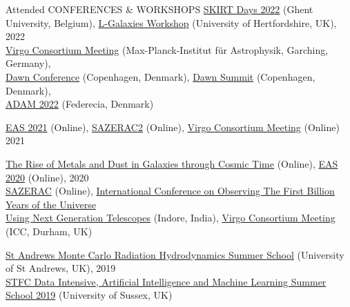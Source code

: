 \documentclass[a4paper,10pt]{resume} %
\begin{document}
\begin{rSection}{Attended CONFERENCES \& WORKSHOPS}
{\href{skirtdays2022.ugent.be}{\color{blue}\textrm{SKIRT Days 2022}} (Ghent University, Belgium), \href{https://lgalaxiespublicrelease.github.io/workshop2022.html}{\color{blue}\textrm{L-Galaxies Workshop}} (University of Hertfordshire, UK),} \hfill {2022}
\\
\href{http://www.virgo.dur.ac.uk/}{\color{blue}\textrm{Virgo Consortium Meeting}} (Max-Planck-Institut f\"{u}r Astrophysik, Garching, Germany),\\
\href{https://cosmicdawn.dk/event/copenhagen-dawn-conference-2022/}{\color{blue}\textrm{Dawn Conference}} (Copenhagen, Denmark), {\href{https://cosmicdawn.dk/meetings-and-workshops/dawn-summit-2022/}{\color{blue}\textrm{Dawn Summit}}} (Copenhagen, Denmark), \\{\href{https://events.au.dk/adam2022/conference}{\color{blue}\textrm{ADAM 2022}} (Federecia, Denmark)}

{\href{https://eas.unige.ch//EAS2021/about.jsp}{\color{blue}\textrm{EAS 2021}} (Online), \href{http://sazerac-conference.org/2021/}{\color{blue}\textrm{SAZERAC2}} (Online), \href{http://www.virgo.dur.ac.uk/}{\color{blue}\textrm{Virgo Consortium Meeting}} (Online)} \hfill {2021}

{\href{https://metals-dust.sciencesconf.org/}{\color{blue}\textrm{The Rise of Metals and Dust in Galaxies through Cosmic Time}} (Online), \href{https://eas.unige.ch/EAS2020/}{\color{blue}\textrm{EAS 2020}} (Online),} \hfill {2020}
\\
\href{http://sazerac-conference.org/2020/}{\color{blue}\textrm{SAZERAC}} (Online), \href{http://www.iiti.ac.in/people/~firstbillion/}{\color{blue}\textrm{International Conference on Observing The First Billion Years of the Universe
\\
Using Next Generation Telescopes}} (Indore, India), \href{http://www.virgo.dur.ac.uk/}{\color{blue}\textrm{Virgo Consortium Meeting}} (ICC, Durham, UK)

{\href{http://www-star.st-and.ac.uk/samcss/}{\color{blue}\textrm{St Andrews Monte Carlo Radiation Hydrodynamics Summer School}} (University of St Andrews, UK), } \hfill {2019}
\\
\href{https://www.sussex.ac.uk/discus/contact/stfcsummerschool2019}{\color{blue}\textrm{STFC Data Intensive, Artificial Intelligence and Machine Learning Summer School 2019}} (University of Sussex, UK)


\end{rSection}
\end{document}
